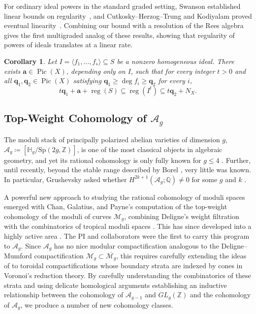 \documentclass[11pt,reqno]{amsart}
\newtheorem{cor}[lemma]{Corollary}
\theoremstyle{remark}
\newcommand{\reg}{\operatorname{reg}}
\newcommand{\Pic}{\operatorname{Pic}}
\newcommand{\GL}{{GL}}
\renewcommand{\aa}{\mathbf{a}}
\newcommand{\qq}{\mathbf{q}}
\newcommand{\HH}{\mathbb{H}}
\newcommand{\QQ}{\mathbb{Q}}
\newcommand{\ZZ}{\mathbb{Z}}
\newcommand{\cA}{\mathcal{A}}
\newcommand{\cM}{\mathcal{M}}
\begin{document}
For ordinary ideal powers in the standard graded setting, Swanson established linear bounds on regularity~\cite{swanson97}, and Cutkosky--Herzog--Trung and Kodiyalam proved eventual linearity~\cite{CHT99,Kodiyalam00}. Combining our bound with a resolution of the Rees algebra gives the first multigraded analog of these results, showing that regularity of powers of ideals translates at a linear rate.

\begin{cor}\cite[Theorem~5.1]{bruceHellerSayrafi22}
Let $I=\langle f_1,\ldots,f_s\rangle\subseteq S$ be a nonzero homogeneous ideal. There exists $\aa\in\Pic(X)$, depending only on $I$, such that for every integer $t>0$ and all $\qq_1,\qq_2\in\Pic(X)$ satisfying $\qq_1\geq\deg f_i\geq\qq_2$ for every $i$,
\[
t\qq_1+\aa+\reg(S)\subseteq\reg(I^t)\subseteq t\qq_2+N_X.
\]
\end{cor}

\subsection{Top-Weight Cohomology of $\mathcal{A}_{g}$}\label{subsec:prior:cohomology-of-ag}

The moduli stack of principally polarized abelian varieties of dimension $g$, $\cA_g\coloneqq[\HH_g/\mathrm{Sp}(2g, \ZZ)]$, is one of the most classical objects in algebraic geometry, and yet its rational cohomology is only fully known for $g\leq 4$ \cite{igusa62,hain02,HT12,HT18}. Further, until recently, beyond the stable range described by Borel \cite{borel74}, very little was known. In particular, Grushevsky asked whether $H^{2k+1}(\cA_{g};\QQ)\neq0$ for some $g$ and $k$ \cite{grushevsky09}.

A powerful new approach to studying the rational cohomology of moduli spaces emerged with Chan, Galatius, and Payne's computation of the top-weight cohomology of the moduli of curves $\cM_g$, combining Deligne's weight filtration with the combinatorics of tropical moduli spaces \cite{CGP21}. This has since developed into a highly active area \cite{CGP22,payneWillwacher21,BCGY23,canningLarsonPayne23}. The PI and collaborators were the first to carry this program to $\cA_g$. Since $\cA_g$ has no nice modular compactification analogous to the Deligne--Mumford compactification $\cM_{g} \subset \overline{\cM_g}$, this requires carefully extending the ideas of \cite{CGP21} to toroidal compactifications whose boundary strata are indexed by cones in Voronoi's reduction theory. By carefully understanding the combinatorics of these strata and using delicate homological arguments establishing an inductive relationship between the cohomology of $\cA_{g-1}$ and $\GL_{g}(\ZZ)$ and the cohomology of $\cA_g$, we produce a number of new cohomology classes. 
\end{document}
